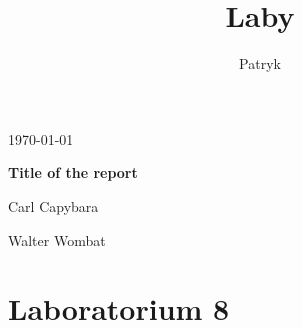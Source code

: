 \documentclass{article}
\title{Laby}
\author{Patryk}
\begin{document}

\begin{titlepage}
	\hfill \today

	\vspace{.2\textheight}

	\begin{center}
		{\LARGE\bfseries Title of the report\par}
		\vspace{3cm}
		Carl Capybara \par
		Walter Wombat \par
	\end{center}
	\vfill\centering  \par
\end{titlepage}

\tableofcontents
\newpage

\section{Laboratorium 8}
 
\end{document}
